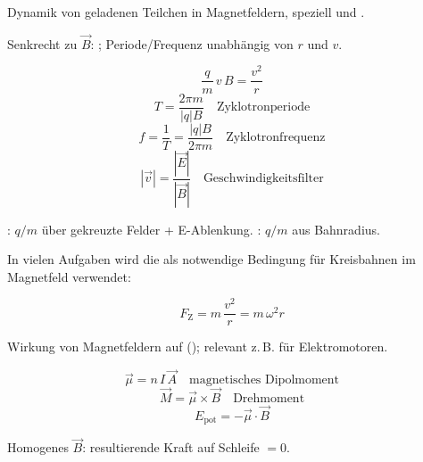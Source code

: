 \begin{runintext}
Dynamik von geladenen Teilchen in Magnetfeldern, speziell  und .
\end{runintext}
\begin{runintext}
Senkrecht zu $\vec{B}$: ; Periode/Frequenz unabhängig von $r$ und $v$.
\end{runintext}
\begin{formulabox}
\[ \frac{q}{m}\,v\,B = \frac{v^2}{r} \]
\formulasep
\[ T = \frac{2\pi m}{|q|B} \quad \text{Zyklotronperiode} \]
\[ f = \frac{1}{T} = \frac{|q|B}{2\pi m} \quad \text{Zyklotronfrequenz} \]
\formulasep
\[ |\vec{v}| = \frac{|\vec{E}|}{|\vec{B}|} \quad \text{Geschwindigkeitsfilter} \]
\end{formulabox}
\begin{runintext}
: $q/m$ über gekreuzte Felder + E-Ablenkung. : $q/m$ aus Bahnradius.
\end{runintext}

\begin{runintext}
In vielen Aufgaben wird die  als notwendige Bedingung für Kreisbahnen im Magnetfeld verwendet:
\end{runintext}
\begin{formulabox}
\[ F_{\mathrm{Z}} = m\,\frac{v^2}{r} = m\,\omega^2 r \]
\end{formulabox}

\begin{runintext}
Wirkung von Magnetfeldern auf  (); relevant z.\,B. für Elektromotoren.
\end{runintext}


\begin{formulabox}
\[ \vec{\mu} = n\,I\,\vec{A} \quad \text{magnetisches Dipolmoment} \]
\formulasep
\[ \vec{M} = \vec{\mu}\times\vec{B} \quad \text{Drehmoment} \]
\[ E_{\mathrm{pot}} = -\vec{\mu}\cdot\vec{B} \]
\end{formulabox}
\begin{runintext}
Homogenes $\vec{B}$: resultierende Kraft auf Schleife $=0$.
\end{runintext}

